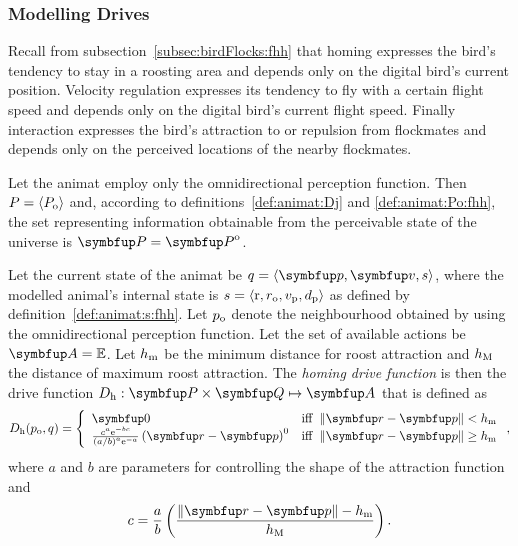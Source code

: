\subsubsection{Modelling Drives}
Recall from subsection~\ref{subsec:birdFlocks:fhh} that homing expresses the bird's tendency to stay in a roosting area and depends only on the digital bird's current position. Velocity regulation expresses its tendency to fly with a certain flight speed and depends only on the digital bird's current flight speed. Finally interaction expresses the bird's attraction to or repulsion from flockmates and depends only on the perceived locations of the nearby flockmates.

Let the animat employ only the omnidirectional perception function. Then $P=\langle P_\textnormal{o} \rangle$ and, according to definitions~\ref{def:animat:Dj} and \ref{def:animat:Po:fhh}, the set representing information obtainable from the perceivable state of the universe is $\set{P}=\set{P}^\textnormal{o}$.

\begin{definition}
  \label{def:animat:Dh:fhh}
  Let the current state of the animat be $q=\langle\vect{p},\vect{v},s\rangle$, where the modelled animal's internal state is $s=\langle\mathrm{r},r_\textnormal{o},v_\textnormal{p},d_\textnormal{p}\rangle$ as defined by definition~\ref{def:animat:s:fhh}. Let $p_\textnormal{o}$ denote the neighbourhood obtained by using the omnidirectional perception function. Let the set of available actions be $\set{A}=\E$. Let $h_\textnormal{m}$ be the minimum distance for roost attraction and $h_\textnormal{M}$ the distance of maximum roost attraction. The \emph{homing drive function} is then the drive function $D_\textnormal{h}: \set{P} \times \set{Q} \mapsto \set{A}$ that is defined as
  \begin{equation}
    D_\textnormal{h}(p_\textnormal{o}, q) = \left\{
    \begin{array}{ll}
    \vect{0} & \mathrm{iff}\ \left\|\vect{r}-\vect{p}\right\| < h_\textnormal{m} \\
    \frac{c^a \mathrm{e}^{-bc}}{\left(a/b\right)^a \mathrm{e}^{-a}} \left(\vect{r}-\vect{p}\right)^0  & \mathrm{iff}\ \left\|\vect{r}-\vect{p}\right\| \geq h_\textnormal{m}
    \end{array}
    \right., \label{eq:animat:Dr:fhh}
  \end{equation}
  where $a$ and $b$ are parameters for controlling the shape of the attraction function and
  \begin{equation}
    c=\frac{a}{b}\left(\frac{\left\|\vect{r}-\vect{p}\right\|-h_\textnormal{m}}{h_\textnormal{M}}\right).
  \end{equation}
\end{definition}

